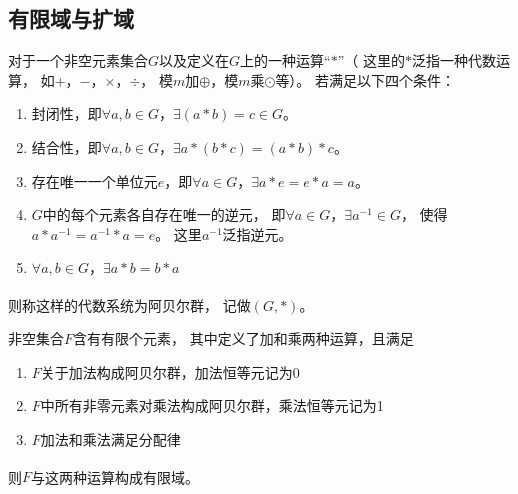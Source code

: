 \subsection{有限域与扩域}
\begin{myDef}[阿贝尔群]
	对于一个非空元素集合$G$以及定义在$G$上的一种运算“$*$”（ 这里的$*$泛指一种代数运算，
	如$+$，$-$，$\times$，$\div$，
	模$m$加$\oplus$，模$m$乘$\odot$等）。
	若满足以下四个条件：
	\begin{enumerate}[fullwidth,itemindent=2em,label=(\arabic*)]
		\item 封闭性，即$\forall a,b \in G$，$\exists\left(a*b\right)=c\in G$。
		\item 结合性，即$\forall a,b \in G$，$\exists a*\left(b*c\right)=\left(a*b\right)*c$。
		\item 存在唯一一个单位元$e$，即$\forall a \in G$，$\exists a*e=e*a=a$。
		\item $G$中的每个元素各自存在唯一的逆元，
		即$\forall a \in G$，$\exists {a^{ - 1}} \in G$，
		使得$a*{a^{-1}}={a^{-1}}*a=e$。
		这里${a^{-1}}$泛指逆元。
		\item $\forall a,b \in G$，$\exists a*b=b*a$
	\end{enumerate}
	\par
	则称这样的代数系统为阿贝尔群，
	记做$\left(G,*\right)$\textsuperscript{\cite{zzc2003}}。
\end{myDef}
\begin{myDef}[有限域]
	非空集合$F$含有有限个元素，
	其中定义了加和乘两种运算，且满足
	\begin{enumerate}[fullwidth,itemindent=2em,label=(\arabic*)]
		\item $F$关于加法构成阿贝尔群，加法恒等元记为0
		\item $F$中所有非零元素对乘法构成阿贝尔群，乘法恒等元记为1
		\item $F$加法和乘法满足分配律
	\end{enumerate}
	\par
	则$F$与这两种运算构成有限域\textsuperscript{\cite{zzc2003}}。
\end{myDef}
